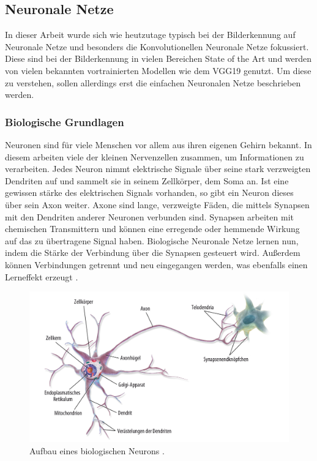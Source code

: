 \documentclass[11pt,bibliography=totocnumbered]{scrartcl}
\begin{document}
\vspace*{-5mm}
\subsection{Neuronale Netze}
In dieser Arbeit wurde sich wie heutzutage typisch bei der Bilderkennung auf Neuronale Netze und besonders die Konvolutionellen Neuronale Netze fokussiert. Diese sind bei der Bilderkennung in vielen Bereichen State of the Art und werden von vielen bekannten vortrainierten Modellen wie dem VGG19 genutzt. Um diese zu verstehen, sollen allerdings erst die einfachen Neuronalen Netze beschrieben werden.
\subsubsection{Biologische Grundlagen}
Neuronen sind für viele Menschen vor allem aus ihren eigenen Gehirn bekannt. In diesem arbeiten viele der kleinen Nervenzellen zusammen, um Informationen zu verarbeiten. Jedes Neuron nimmt elektrische Signale über seine stark verzweigten Dendriten auf und sammelt sie in seinem Zellkörper, dem Soma an. Ist eine gewissen stärke des elektrischen Signals vorhanden, so gibt ein Neuron dieses über sein Axon weiter. Axone sind lange, verzweigte Fäden, die mittels Synapsen mit den Dendriten anderer Neuronen verbunden sind. Synapsen arbeiten mit chemischen Transmittern und können eine erregende oder hemmende Wirkung auf das zu übertragene Signal haben. Biologische Neuronale Netze lernen nun, indem die Stärke der Verbindung über die Synapsen gesteuert wird. Außerdem können Verbindungen getrennt und neu eingegangen werden, was ebenfalls einen Lerneffekt erzeugt \cite[S.24]{BA}\cite[S.43-45]{DEEP_LEARNING}\cite[S.29-30]{NNP}.
\begin{figure}[H]
	\centering
	\includegraphics[width=1\textwidth]{neuron_biologisch}
	\vspace*{-5mm}
	\caption[Aufbau eines biologischen Neurons]{Aufbau eines biologischen Neurons \cite[S.255]{MACHINE_LEARNING}.}
	\label{fig:aufbau_bio_neuron}
\end{figure}
\vspace*{-5mm}
\end{document}
